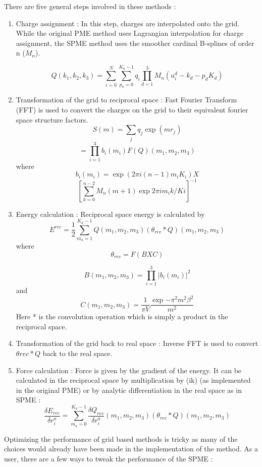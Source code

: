 \documentclass[9pt,bestpractices]{livecoms}
\begin{document}
There are five general steps involved in these methods :
\begin{enumerate}
\item Charge assignment : In this step, charges are interpolated onto the grid. While the original PME method uses Lagrangian interpolation for charge assignment, the SPME method uses the smoother cardinal B-splines of order n ($M_n$).  

\[
Q(k_1,k_2,k_3) = \sum_{i=0}^{N}\sum_{p_a=0}^{K_a-1} q_i \prod_{d=1}^3 M_n(u_i^d - k_d - p_dK_d)
\]
\item Transformation of the grid to reciprocal space : Fast Fourier Transform (FFT) is used to convert the charges on the grid to their equivalent fourier space structure factors.    
\[
S(m) = \sum_j q_j \exp(mr_j)
\]
\[
=\prod_{i=1}^{3} b_i(m_i)F(Q)(m_1,m_2,m_3)
\]
where
\[
b_i(m_i) = \exp(2\pi i (n-1)m_iK_i) X
\]
\[ [\sum_{k=0}^{n-2}M_n(m+1)\exp{2\pi im_ik/Ki}]^{-1}
\] 
\item Energy calculation : Reciprocal space energy is calculated by
\[
E^{rec} = \frac{1}{2} \sum_{m_a=1}^{K_a-1} Q(m_1,m_2,m_3)(\theta_{rec}*Q)(m_1,m_2,m_3)
\]
where
\[
\theta_{rec} = F(BXC)
\]

\[
B(m_1,m_2,m_3) = \prod_{i=1}^{3} |b_i(m_i)|^2
\]
and
\[
C(m_1,m_2,m_3) = \frac{1}{\pi V} \frac{ \exp{- \pi^2 m^2 \beta^2}}{m^2}
\]
Here * is the convolution operation which is simply a product in the reciprocal space. 
\item Transformation of the grid back to real space : Inverse FFT is used to convert $\theta{rec}*Q$ back to the real space. 
\item Force calculation : Force is given by the gradient of the energy. It can be calculated in the reciprocal space by multiplication by (ik) (as implemented in the original PME) or by analytic differentiation in the real space as in SPME : 
\[
\frac{\delta E_{rec}}{\delta r_i^a}  = \sum_{m_a=0}^{K_a-1} \frac{\delta Q_{rec}}{\delta r_i^a}(m_1,m_2,m_3) (\theta_{rec}*Q)(m_1,m_2,m_3)
\]
\end{enumerate}



Optimizing the performance of grid based methods is tricky as many of the choices would already have been made in the implementation of the method. As a user, there are a few ways to tweak the performance of the SPME : 
 
\end{document}
